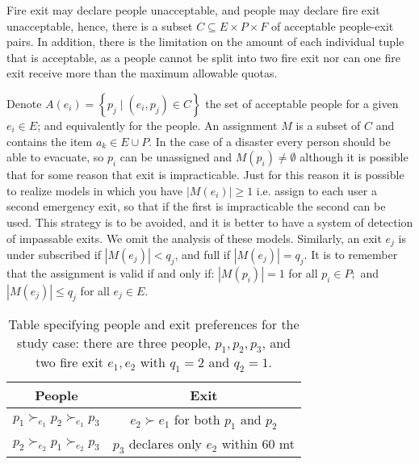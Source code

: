 \documentclass[letterpaper]{article} %
\begin{document}

    Fire exit may declare people unacceptable, and people may declare fire exit unacceptable,
    hence, there is a subset \(C \subseteq E \times P \times F\) of acceptable people-exit pairs.
    In addition, there is the limitation on the amount of each individual tuple that is acceptable, as a people
    cannot be split into two fire exit nor can one fire exit receive more than the maximum allowable quotas.

    Denote \( A \left( e _ { i } \right) = \left\{ p _ { j } \mid \left( e _ { i } , p _ { j } \right) \in C \right\} \)
    the set of acceptable people for a given \( e _ { i } \in E \); and equivalently for the people.
    An assignment \(M\) is a subset of \(C\) and contains the item \( a _ { k } \in E \cup P \).
    In the case of a disaster every person should be able to evacuate, so  \( p _ { i } \) can be unassigned and
    \( M \left( p _ { i } \right) \neq \emptyset \) although it is possible that for some reason that exit is impracticable.
    Just for this reason it is possible to realize models in which you have \(|M \left( e _ { i } \right)| \geq 1\)
    i.e. assign to each user a second emergency exit, so that if the first is impracticable the second can be used.
    This strategy is to be avoided, and it is better to have a system of detection of impassable exits.
    We omit the analysis of these models.
    Similarly, an exit \( e _ { j } \) is  under subscribed if
    \( \left| M \left( e _ { j } \right) \right| < q _ { j } \), and full if
    \( \left| M \left( e _ { j } \right) \right| = q _ { j } \).
    It is to remember that the assignment is valid if and only if:
    \( \left| M \left( p _ { i } \right) \right| = 1 \) for all \( p _ { i } \in P ; \) and
    \( \left| M \left( e _ { j } \right) \right| \leq q _ { j } \) for all \( e _ { j } \in E  \).

    \begin{table}[!htb]
        \begin{tabular}{c|c}
            \hline People                                             & Exit                                                       \\
            \hline\( p_{1} \succ_{e_{1}} p_{2} \succ_{e_{1}} p_{3} \) & \( e_{2} \succ e_{1} \) for both \( p_{1} \) and \( p_{2} \) \\
            \( p_{2} \succ_{e_{2}} p_{1} \succ_{e_{2}} p_{3} \)       & \( p_{3} \) declares only \( e_{2} \) within 60 mt         \\
            \hline
        \end{tabular}
        \caption{Table specifying people and exit preferences for
            the study case: there are three people, \( p _ { 1 } , p _ { 2 } , p _ { 3 } \), and two fire exit
            \( e _ { 1 } , e _ { 2 } \) with \( q _ { 1 } = 2 \) and \( q _ { 2 } = 1 \).}
        \label{tab:people-exit}
    \end{table}
\end{document}
